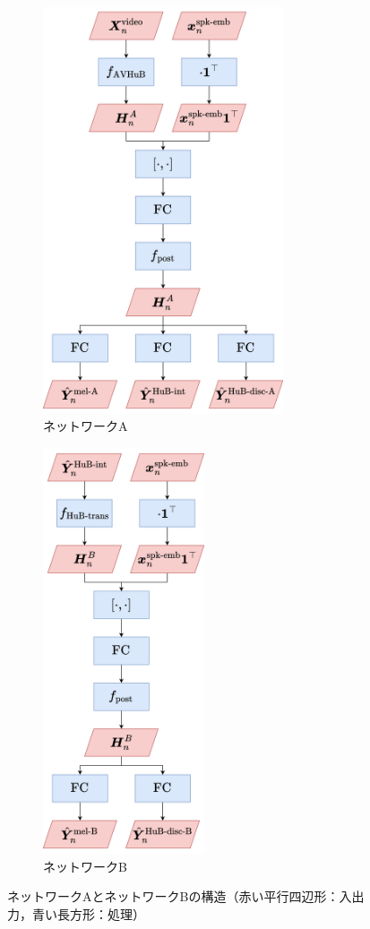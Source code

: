 \begin{figure}[tb]
    \centering
    \begin{subfigure}[b]{0.48\textwidth}
        \centering
        \includegraphics[height=120mm]{./figure/sec4/model_2/networkA.drawio.png}
        \caption{ネットワークA}
        \label{sec4:fig:networkA}
    \end{subfigure}
    \hfill
    \begin{subfigure}[b]{0.48\textwidth}
        \centering
        \includegraphics[height=120mm]{./figure/sec4/model_2/networkB.drawio.png}
        \caption{ネットワークB}
        \label{sec4:fig:networkB}
    \end{subfigure}
    \hfill
    \caption{ネットワークAとネットワークBの構造（赤い平行四辺形：入出力，青い長方形：処理）}
    \label{sec4:fig:networkAB}
\end{figure}

